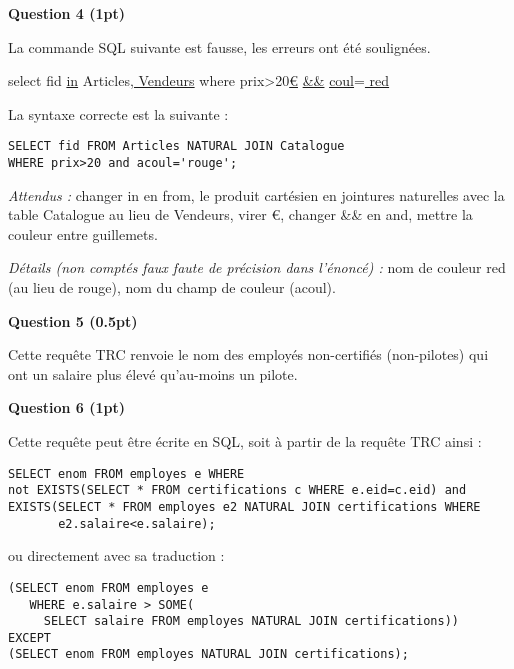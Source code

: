 \documentclass{article}
\begin{document}
\vspace{0.3cm}
\noindent
\textbf{Question 4 (1pt)}

\noindent
La commande SQL suivante est fausse, les erreurs ont été soulignées.

\noindent
select fid \underline{in} Articles\underline{, Vendeurs} where prix>20\underline{\euro{}} \underline{\&\&} \underline{coul}=\underline{ red }

\noindent
La syntaxe correcte est la suivante :
\begin{verbatim}
SELECT fid FROM Articles NATURAL JOIN Catalogue
WHERE prix>20 and acoul='rouge';
\end{verbatim}

\noindent
\textit{Attendus :} changer in en from, le produit cartésien en jointures
naturelles avec la table Catalogue au lieu de Vendeurs, virer \euro{}, changer
\&\& en and, mettre la couleur entre guillemets.

\noindent
\textit{Détails (non comptés faux faute de précision dans l'énoncé) :} nom
de couleur red (au lieu de rouge), nom du champ de couleur (acoul).

\vspace{0.3cm}
\noindent
\textbf{Question 5 (0.5pt)}

\noindent
Cette requête TRC renvoie le nom des employés non-certifiés (non-pilotes) qui ont un salaire plus élevé qu'au-moins un pilote.

\vspace{0.3cm}
\noindent
\textbf{Question 6 (1pt)}

\noindent
Cette requête peut être écrite en SQL, soit à partir de la requête TRC ainsi :

\begin{verbatim}
SELECT enom FROM employes e WHERE
not EXISTS(SELECT * FROM certifications c WHERE e.eid=c.eid) and
EXISTS(SELECT * FROM employes e2 NATURAL JOIN certifications WHERE
       e2.salaire<e.salaire);
\end{verbatim}

\noindent
ou directement avec sa traduction :

\begin{verbatim}
(SELECT enom FROM employes e
   WHERE e.salaire > SOME(
     SELECT salaire FROM employes NATURAL JOIN certifications))
EXCEPT
(SELECT enom FROM employes NATURAL JOIN certifications);
\end{verbatim}
\end{document}
